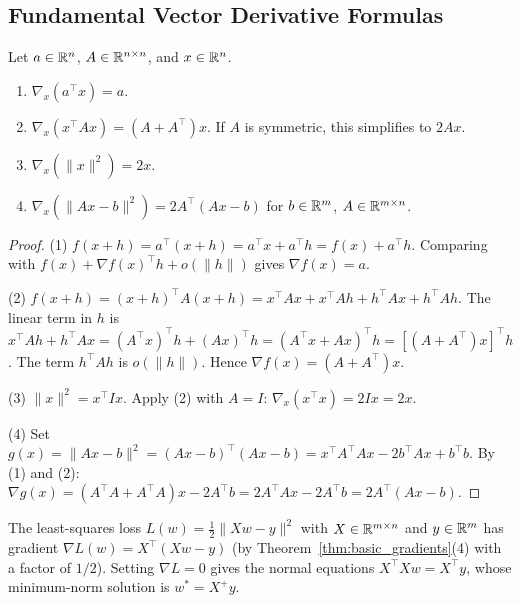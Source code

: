 \documentclass[11pt,a4paper]{article}
\begin{document}
\subsection{Fundamental Vector Derivative Formulas}

\begin{theorem}
\label{thm:basic_gradients}
Let $a \in \mathbb{R}^n$, $A \in \mathbb{R}^{n \times n}$, and $x \in \mathbb{R}^n$.
\begin{enumerate}[nosep]
  \item $\nabla_x(a^\top x) = a$.
  \item $\nabla_x(x^\top A x) = (A + A^\top) x$.
        If $A$ is symmetric, this simplifies to $2Ax$.
  \item $\nabla_x(\|x\|^2) = 2x$.
  \item $\nabla_x(\|Ax - b\|^2) = 2A^\top(Ax - b)$ for $b \in \mathbb{R}^m$,
        $A \in \mathbb{R}^{m \times n}$.
\end{enumerate}
\end{theorem}

\begin{proof}
(1) $f(x + h) = a^\top(x + h) = a^\top x + a^\top h = f(x) + a^\top h$.
Comparing with $f(x) + \nabla f(x)^\top h + o(\|h\|)$ gives
$\nabla f(x) = a$.

(2) $f(x + h) = (x + h)^\top A (x + h)
= x^\top Ax + x^\top Ah + h^\top Ax + h^\top Ah$.
The linear term in $h$ is $x^\top Ah + h^\top Ax = (A^\top x)^\top h + (Ax)^\top h
= (A^\top x + Ax)^\top h = [(A + A^\top)x]^\top h$.  The term $h^\top Ah$
is $o(\|h\|)$.  Hence $\nabla f(x) = (A + A^\top)x$.

(3) $\|x\|^2 = x^\top I x$.  Apply (2) with $A = I$:
$\nabla_x(x^\top x) = 2Ix = 2x$.

(4) Set $g(x) = \|Ax - b\|^2 = (Ax - b)^\top(Ax - b)
= x^\top A^\top A x - 2b^\top Ax + b^\top b$.  By (1) and (2):
$\nabla g(x) = (A^\top A + A^\top A)x - 2A^\top b
= 2A^\top A x - 2A^\top b = 2A^\top(Ax - b)$.
\end{proof}

\begin{example}
\label{ex:quadratic_loss}
The least-squares loss $L(w) = \frac{1}{2}\|Xw - y\|^2$ with
$X \in \mathbb{R}^{m \times n}$ and $y \in \mathbb{R}^m$ has gradient
$\nabla L(w) = X^\top(Xw - y)$
(by Theorem~\ref{thm:basic_gradients}(4) with a factor of $1/2$).
Setting $\nabla L = 0$ gives the normal equations
$X^\top X w = X^\top y$, whose minimum-norm solution is $w^* = X^+ y$.
\end{example}
\end{document}
